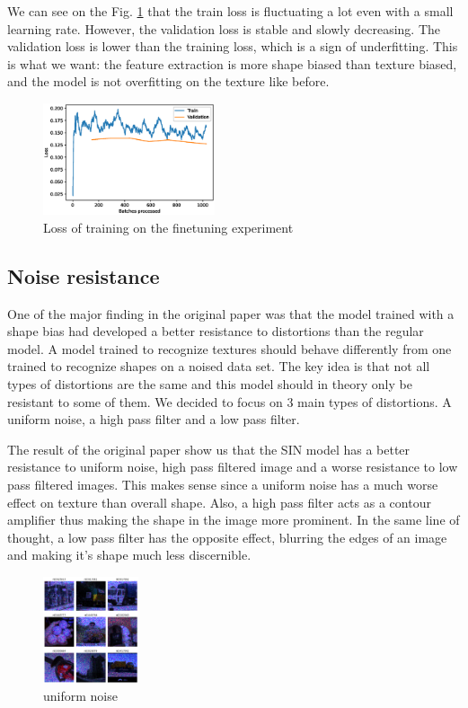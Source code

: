\documentclass{article}
\begin{document}
We can see on the Fig. \ref{loss_finetune} that the train loss is fluctuating a lot even with a small
learning rate. However, the validation loss is stable and slowly decreasing.
The validation loss is lower than the training loss, which is a sign of underfitting. This is what we want:
the feature extraction is more shape biased than texture biased, and the model is not overfitting on the texture like
before.

\begin{figure}[h!]
  \includegraphics[width = 0.45\textwidth]{imgs/sinin/finetune/loss.eps}
  \caption{Loss of training on the finetuning experiment}
  \label{loss_finetune}
\end{figure}

\subsection{Noise resistance}


One of the major finding in the original paper was that the model trained with a shape bias had developed a better resistance to distortions than the regular model.
A model trained to recognize textures should behave differently from one trained to recognize shapes on a noised data set.  The key idea is that not all types of distortions are the same and this model should in theory only be resistant to some of them.  We decided to focus on 3 main types of distortions.  A uniform noise, a high pass filter and a low pass filter.

The result of the original paper show us that the SIN model has a better resistance to uniform noise, high pass filtered image and a worse resistance to low pass filtered images.
This makes sense since a uniform noise has a much worse effect on texture than overall shape. Also, a high pass filter acts as a contour amplifier thus making the shape in the image more prominent. In the same line of thought, a low pass filter has the opposite effect, blurring the edges of an image and making it's shape much less discernible.

\begin{figure}[h!]
\centering
\includegraphics[width = 0.25\textwidth]{imgs/image_uniform}
\caption{uniform noise}
\end{figure}
\end{document}
